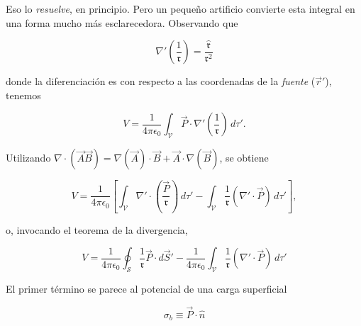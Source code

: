 \documentclass[12pt,a4paper]{report}
\newcommand{\esp}{\vspace{0.5cm}}
\begin{document}
	\esp
	
	\noindent Eso lo \textit{resuelve}, en principio. Pero un pequeño artificio convierte esta integral en una forma mucho más esclarecedora. Observando que
	
	\esp
	
	\begin{equation*}
		\nabla' \left( \frac{1}{\mathfrak{r}} \right) = \frac{\hat{\mathfrak{r}}}{\mathfrak{r}^2}
	\end{equation*}
	
	\esp
	
	\noindent donde la diferenciación es con respecto a las coordenadas de la \textit{fuente} ($\vec{r}'$), tenemos
	
	\esp
	
	\begin{equation*}
		V = \frac{1}{4\pi\epsilon_0} \int_{\mathcal{V}} \vec{P} \cdot \nabla' \left( \frac{1}{\mathfrak{r}} \right) \, d\tau'.
	\end{equation*}
	
	\esp
	
	\noindent Utilizando $\nabla \cdot (\vec{A} \vec{B}) = \nabla (\vec{A}) \cdot \vec{B} + \vec{A} \cdot \nabla(\vec{B})$, se obtiene
	
	\esp
	
	\begin{equation*}
		V = \frac{1}{4\pi\epsilon_0} \left[ \int_{\mathcal{V}} \nabla' \cdot \left( \frac{\vec{P}}{\mathfrak{r}} \right) \, d\tau' - \int_{\mathcal{V}} \frac{1}{\mathfrak{r}} (\nabla' \cdot \vec{P}) \, d\tau' \right],
	\end{equation*}
	
	\esp
	
	\noindent o, invocando el teorema de la divergencia,
	
	\esp
	
	\begin{equation}
		V = \frac{1}{4\pi\epsilon_0} \oint_{\mathcal{S}} \frac{1}{\mathfrak{r}} \vec{P} \cdot d\vec{S}' - \frac{1}{4\pi\epsilon_0} \int_{\mathcal{V}} \frac{1}{\mathfrak{r}} (\nabla' \cdot \vec{P}) \, d\tau'
		\label{eq:god}
	\end{equation}
	
	\esp
	
	\noindent El primer término se parece al potencial de una carga superficial
	
	\esp
	
	\begin{equation}
		\sigma_b \equiv \vec{P} \cdot \hat{n}
	\end{equation}
	
\end{document}
